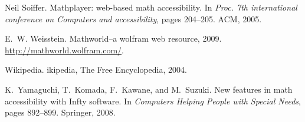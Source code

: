 \documentclass{sig-alternate}
\begin{document}
\begin{thebibliography}{10}
Neil Soiffer.
\newblock Mathplayer: web-based math accessibility.
\newblock In {\em Proc. 7th international conference
  on Computers and accessibility}, pages 204--205. ACM, 2005.

E.~W. Weisstein.
\newblock Mathworld--a wolfram web resource, 2009.
\newblock \url{http://mathworld.wolfram.com/}.

Wikipedia.
ikipedia{,} {The Free Encyclopedia}, 2004.

K.~Yamaguchi, T.~Komada, F.~Kawane, and M.~Suzuki.
\newblock New features in math accessibility with Infty software.
\newblock In {\em Computers Helping People with Special Needs}, pages 892--899.
  Springer, 2008.

\end{thebibliography}
\end{document}
